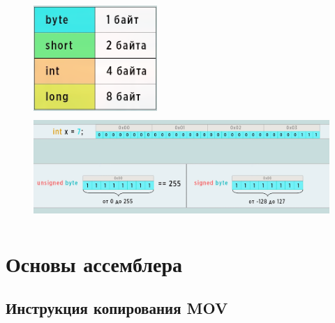 	\begin{figure}[h]
		\centering
		\begin{minipage}{0.25\textwidth}
			\centering
			\includegraphics[height=4cm]{img/2.2} 
			\captionsetup{font=footnotesize} 
			\caption*{} 
		\end{minipage}
		\hfill
		\begin{minipage}{0.65\textwidth}
			\centering
			\includegraphics[height=4cm]{img/2.3} 
			\captionsetup{font=footnotesize} 
			\caption*{} 
		\end{minipage}
	\end{figure}
    
	\section{Основы ассемблера}
	
    \subsection{Инструкция копирования MOV}
	
